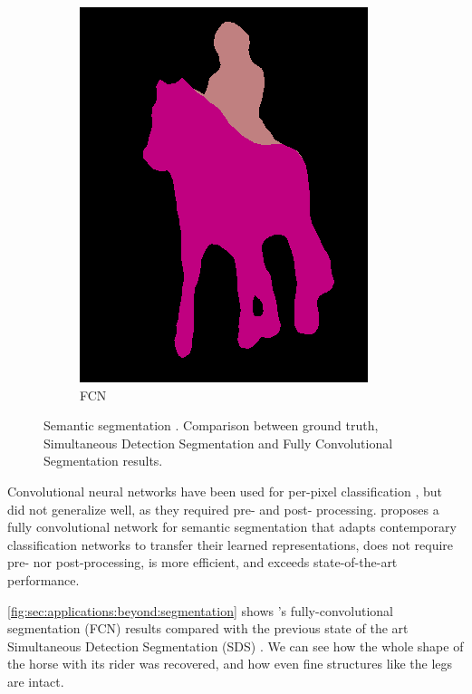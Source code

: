 \begin{figure}[t]
\begin{subfigure}[b]{0.244\textwidth}
    \includegraphics[width=\textwidth]{gfx/app-segmentation-4}
    \caption{FCN \cite{Long2015}}
  \end{subfigure}
  \caption{
    Semantic segmentation \cite{Long2015}.
    Comparison between ground truth, Simultaneous Detection Segmentation and Fully Convolutional Segmentation results.
  }
  \label{fig:sec:applications:beyond:segmentation}
\end{figure}

Convolutional neural networks have been used for per-pixel classification \cite{Farabet2013,Hariharan2014}, but did not generalize well, as they required pre- and post- processing.
\citet{Long2015} proposes a fully convolutional network for semantic segmentation that adapts contemporary classification networks to transfer their learned representations, does not require pre- nor post-processing, is more efficient, and exceeds state-of-the-art performance.

\autoref{fig:sec:applications:beyond:segmentation} shows \citeauthor{Long2015}'s fully-convolutional segmentation (FCN) results compared with the previous state of the art Simultaneous Detection Segmentation (SDS) \cite{Hariharan2014}.
We can see how the whole shape of the horse with its rider was recovered, and how even fine structures like the legs are intact.

